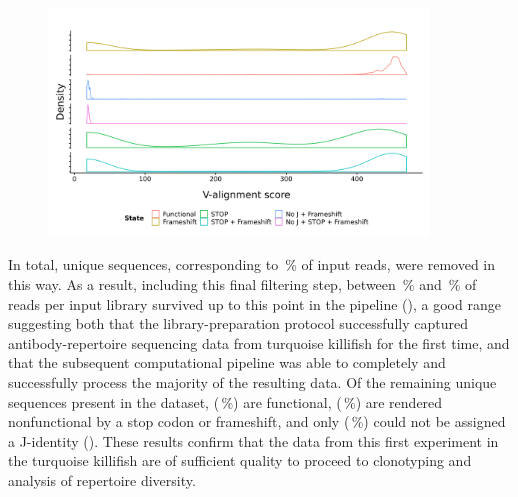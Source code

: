 \begin{figure}
\centering
\includegraphics[width = 0.9\textwidth]{_Figures/png/pilot-functional-vscores}
\label{fig:igseq-pilot-functional-vscores}
\end{figure}

In total,  unique sequences, corresponding to \,\% of input reads, were removed in this way. As a result, including this final filtering step, between \,\% and \,\% of reads per input library survived up to this point in the pipeline (), a good range suggesting both that the library-preparation protocol successfully captured antibody-repertoire sequencing data from turquoise killifish for the first time, and that the subsequent computational pipeline was able to completely and successfully process the majority of the resulting data. Of the remaining  unique sequences present in the dataset,  (\,\%) are functional,  (\,\%) are rendered nonfunctional by a stop codon or frameshift, and only  (\,\%) could not be assigned a J-identity (). These results confirm that the data from this first \igseq experiment in the turquoise killifish are of sufficient quality to proceed to clonotyping and analysis of repertoire diversity.

